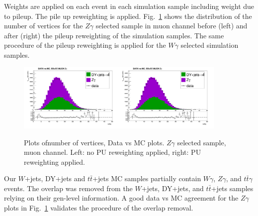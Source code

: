 Weights are applied on each event in each simulation sample including weight due to pileup. The pile up reweighting is applied. Fig.~\ref{fig:DATAvsMC_nVtx} shows the distribution of the number of vertices for the $Z\gamma$ selected sample in muon channel before (left) and after (right) the pileup reweighting of the simulation samples. The same procedure of the pileup reweighting is applied for the $W\gamma$ selected simulation samples.

\begin{figure}[htb]
  \begin{center}
   \includegraphics[width=0.45\textwidth]{../figs/figs_v11/MUON_ZGamma/PrepareYields/c_TotalDATAvsMC_EtaCommon__nVtx_noPU.png}\includegraphics[width=0.45\textwidth]{../figs/figs_v11/MUON_ZGamma/PrepareYields/c_TotalDATAvsMC_EtaCommon__nVtx.png}
  \caption{Plots ofnumber of vertices, Data vs MC plots. $Z\gamma$ selected sample, muon channel. Left: no PU reweighting applied, right: PU reweighting applied. }
  \label{fig:DATAvsMC_nVtx}
  \end{center}
\end{figure}

Our $W$+jets, DY+jets and $t\bar{t}$+jets MC samples partially contain $W\gamma$, $Z\gamma$, and $t\bar{t}\gamma$ events. The overlap was removed from the $W$+jets, DY+jets, and $t\bar{t}$+jets samples relying on their gen-level information. A good data vs MC agreement for the $Z\gamma$ plots in Fig.~\ref{fig:DATAvsMC_nVtx} validates the procedure of the overlap removal.

